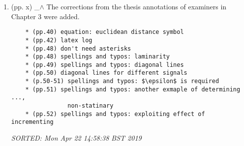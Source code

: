 \documentclass[12pt]{article}
\begin{document}
\begin{enumerate}
	\begin{verbatim}
	%CHAPTER 5
	* Fig 5.5: embedding parameters $\overline{m_0}=6$, $\overline{\tau_0}=10$.
	* Fig 5.6: embedding parameters $\overline{m_0}=6$, $\overline{\tau_0}=10$.
	* Fig 5.7: embedding parameters $\overline{m_0}=6$, $\overline{\tau_0}=10$.
	* Fig 5.8: embedding parameters $\overline{m_0}=6$, $\overline{\tau_0}=10$.
	* 5.5 RP: $\overline{m_0}=6$, $\overline{\tau_0}=6$ and a recurrence 
	* Fig 5.9: embedding parameters $\overline{m_0}=6$, $\overline{\tau_0}=10$ and 
	* Fig 5.10: embedding parameters $\overline{m_0}=6$, $\overline{\tau_0}=10$ and 
	* Fig 5.11: embedding parameters $\overline{m_0}=6$, $\overline{\tau_0}=10$ and 
	* Fig 5.12: embedding parameters $\overline{m_0}=6$, $\overline{\tau_0}=10$ and 	
	* 5.6 RQA: embedding parameters $\overline{m_0}=6$, $\overline{\tau_0}=10$ and 
	* Fig 5.13: embedding parameters $\overline{m_0}=6$, $\overline{\tau_0}=10$ and 
	* Fig 5.14: embedding parameters $\overline{m_0}=6$, $\overline{\tau_0}=10$ and
 	%CHAPTER 6
	* Fig 6.4: embedding parameters $\overline{m_0}=6$, $\overline{\tau_0}=8$ and 
	* Fig 6.5: embedding parameters $\overline{m_0}=6$, $\overline{\tau_0}=8$ and
	* 6.5 RP: ($\overline{m_0}=6$, $\overline{\tau_0}=8$) 
	* Fig 6.6: embedding parameters $\overline{m_0}=6$, $\overline{\tau_0}=8$ and
	* Fig 6.7: embedding parameters $\overline{m_0}=6$, $\overline{\tau_0}=8$ and
	* 6.6 RQA: embedding parameters $\overline{m_0}=6$, $\overline{\tau_0}=8$ and 
	* Fig 6.8: embedding parameters $\overline{m_0}=6$, $\overline{\tau_0}=8$ and
	\end{verbatim}
	\textit{
	SORTED:  \\
	Mon Apr 22 20:45:14 BST 2019 \\
	Mon  6 May 12:01:39 BST 2019 (amend)
	}
	\\






\item  (pp. x)  \_$\wedge$  
	The corrections from the thesis annotations of examiners in Chapter 3
	were added. 
	\begin{verbatim}
	* (pp.40) equation: euclidean distance symbol
	* (pp.42) latex log
	* (pp.48) don't need asterisks 
	* (pp.48) spellings and typos: laminarity
	* (pp.49) spellings and typos: diagonal lines
	* (pp.50) diagonal lines for different signals 
	* (p.50-51) spellings and typos: $\epsilon$ is required
	* (pp.51) spellings and typos: another exmaple of determining ...,
				non-statinary  
	* (pp.52) spellings and typos: exploiting effect of incrementing 
	\end{verbatim}
	\textit{
	SORTED:  Mon Apr 22 14:58:38 BST 2019
	}
	\\





\end{enumerate}
\end{document}
